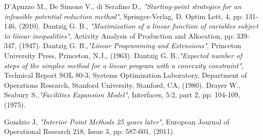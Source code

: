 \documentclass[a4paper,10 pt,titlepage,twoside]{report}
\theoremstyle{plain}
\theoremstyle{definition}
\theoremstyle{remark}
\begin{document}
{{\begin{thebibliography}{9}
	 D'Apuzzo M., De Simone V., di Serafino D., \emph{"Starting-point strategies for an infeasible potential reduction method"}, Springer-Verlag, D. Optim Lett, 4, pp: 131-146, (2010).
	Dantzig G. B., \emph{"Maximization of a linear function of variables subject to linear
	inequalities"}, Activity Analysis of Production and Allocation, pp: 339-347, (1947).
	Dantzig G. B.,\emph{\;"Linear Programming and Extensions"}, Princeton University Press, Princeton, N.J., (1963).	
	Dantzig G. B.,\emph{\;"Expected number of steps of the simplex method for a linear program with a convexity constraint"}, Technical Report SOL 80-3, Systems Optimization Laboratory, Department of Operations Research, Stanford University, Stanford, CA, (1980).
	Drayer W., Seabury S.,\emph{\;"Facilities Expansion Model"}, Interfaces, 5:2, part 2, pp: 104-109, (1975).
	
	
	 Gondzio J, \textit{ "Interior Point Methods 25 years later"}, European Journal of Operational Research 218, Issue 3, pp: 587-601, (2011).	
	

\end{thebibliography}}}
\end{document}
